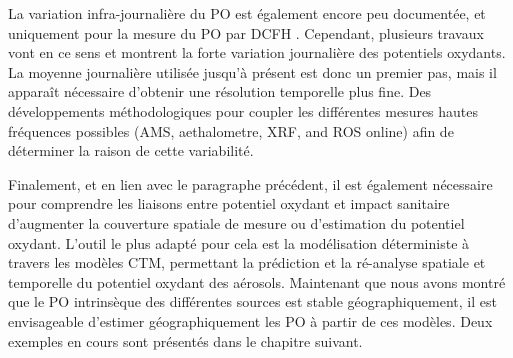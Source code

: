 La variation infra-journalière du PO est également encore peu documentée, et uniquement
pour la mesure du PO par DCFH \autocite{venkatachariMeasurement2005,costabileFirst2017}.
Cependant, plusieurs travaux vont en ce sens
\autocite{zhouDevelopment2018,jovanovicMeasurements2019} et montrent la forte variation
journalière des potentiels oxydants.  La moyenne journalière utilisée jusqu'à présent est
donc un premier pas, mais il apparaît nécessaire d'obtenir une résolution temporelle plus
fine.  Des développements méthodologiques pour coupler les différentes mesures hautes
fréquences possibles (AMS, aethalometre, XRF, and ROS online) afin de déterminer la raison
de cette variabilité.

Finalement, et en lien avec le paragraphe précédent, il est également nécessaire pour
comprendre les liaisons entre potentiel oxydant et impact sanitaire d'augmenter la
couverture spatiale de mesure ou d'estimation du potentiel oxydant. L'outil le plus adapté pour cela est
la modélisation déterministe à travers les modèles CTM, permettant la prédiction et la
ré-analyse spatiale et temporelle du potentiel oxydant des aérosols. Maintenant que nous
avons montré que le PO intrinsèque des différentes sources est stable géographiquement,
il est envisageable d'estimer géographiquement les PO à partir de ces modèles. Deux
exemples en cours sont présentés dans le chapitre suivant.
